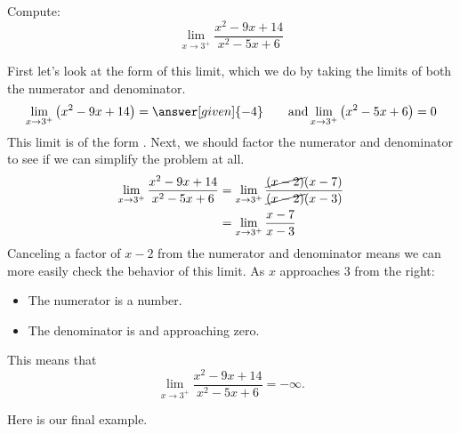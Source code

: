 \documentclass{ximera}
\begin{document}
\begin{example}
  Compute:
  \[
  \lim_{x\to 3^+} \frac{x^2-9x+14}{x^2-5x+6}
  \]
  \begin{explanation}
    First let's look at the form of this limit, which we do by taking the limits of both the numerator and denominator.
    \[
    \lim_{x\to 3^+} \left(x^2-9x+14\right) = \answer[given]{-4}\qquad\text{and}\lim_{x\to3^+}\left(x^2-5x+6\right) = 0
    \]
    This limit is of the form \numOverZero. Next, we should factor the numerator and denominator to see if we can simplify the problem at all. 
    \begin{align*}
      \lim_{x\to 3^+}\frac{x^2-9x+14}{x^2-5x+6} &= \lim_{x\to 3^+}\frac{\cancel{(x-2)}(x-7)}{\cancel{(x-2)}(x-3)}\\
      &= \lim_{x\to 3^+}\frac{x-7}{x-3}
    \end{align*}
    Canceling a factor of $x-2$ from the numerator and denominator
    means we can more easily check the behavior of this limit.  As $x$
    approaches $3$ from the right:
    \begin{itemize}
    \item The numerator is a  number. 
    \item The denominator is  and approaching zero.
    \end{itemize}
    This means that
    \[
    \lim_{x\to 3^+} \frac{x^2-9x+14}{x^2-5x+6} = -\infty.
    \]
   \end{explanation}
\end{example}

Here is our final example.
\end{document}
